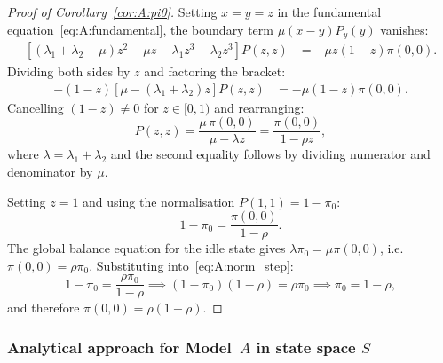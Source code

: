 \begin{proof}[Proof of Corollary~\ref{cor:A:pi0}]
Setting $x=y=z$ in the fundamental equation~\eqref{eq:A:fundamental}, the boundary
term $\mu(x-y)P_y(y)$ vanishes:
    \begin{align*}
        \left[ (\lambda_1+\lambda_2+ \mu)z^2 - \mu z - \lambda_1 z^3 - \lambda_2 z^3 \right] P(z,z)
        &= - \mu z(1-z) \pi(0,0).
    \end{align*}
    Dividing both sides by $z$ and factoring the bracket:
    \begin{align*}
        -(1-z)\left[ \mu - (\lambda_1 + \lambda_2)z \right] P(z,z)
        &= - \mu (1-z) \pi(0,0).
    \end{align*}
    Cancelling $(1-z)\neq 0$ for $z\in[0,1)$ and rearranging:
    \begin{equation}
        P(z,z) = \frac{\mu\,\pi(0,0)}{\mu - \lambda z} = \frac{\pi(0,0)}{1-\rho z},
        \label{eq:A:Pzz_proof}
    \end{equation}
    where $\lambda = \lambda_1+\lambda_2$ and the second equality follows by dividing
    numerator and denominator by $\mu$.

    Setting $z=1$ and using the normalisation $P(1,1) = 1-\pi_0$:
    \begin{equation}
        1-\pi_0 = \frac{\pi(0,0)}{1-\rho}. \label{eq:A:norm_step}
    \end{equation}
    The global balance equation for the idle state gives $\lambda\pi_0 = \mu\pi(0,0)$,
    i.e.\ $\pi(0,0) = \rho\pi_0$. Substituting into~\eqref{eq:A:norm_step}:
    \begin{equation*}
        1-\pi_0 = \frac{\rho\pi_0}{1-\rho}
        \implies (1-\pi_0)(1-\rho) = \rho\pi_0
        \implies \pi_0 = 1-\rho,
    \end{equation*}
    and therefore $\pi(0,0) = \rho(1-\rho)$.
\end{proof}

\subsubsection{Analytical approach for Model~\texorpdfstring{$A$}{A} in state space \texorpdfstring{$S$}{S}}\label{sssec:A:analytical}

